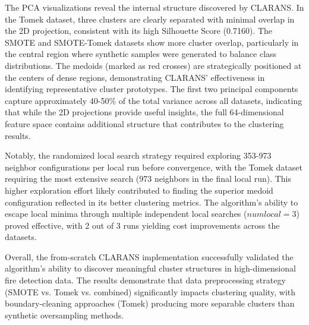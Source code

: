 The PCA visualizations reveal the internal structure discovered by CLARANS. In the Tomek dataset, three clusters are clearly separated with minimal overlap in the 2D projection, consistent with its high Silhouette Score (0.7160). The SMOTE and SMOTE-Tomek datasets show more cluster overlap, particularly in the central region where synthetic samples were generated to balance class distributions. The medoids (marked as red crosses) are strategically positioned at the centers of dense regions, demonstrating CLARANS' effectiveness in identifying representative cluster prototypes. The first two principal components capture approximately 40-50\% of the total variance across all datasets, indicating that while the 2D projections provide useful insights, the full 64-dimensional feature space contains additional structure that contributes to the clustering results.

Notably, the randomized local search strategy required exploring 353-973 neighbor configurations per local run before convergence, with the Tomek dataset requiring the most extensive search (973 neighbors in the final local run). This higher exploration effort likely contributed to finding the superior medoid configuration reflected in its better clustering metrics. The algorithm's ability to escape local minima through multiple independent local searches ($numlocal=3$) proved effective, with 2 out of 3 runs yielding cost improvements across the datasets.

Overall, the from-scratch CLARANS implementation successfully validated the algorithm's ability to discover meaningful cluster structures in high-dimensional fire detection data. The results demonstrate that data preprocessing strategy (SMOTE vs. Tomek vs. combined) significantly impacts clustering quality, with boundary-cleaning approaches (Tomek) producing more separable clusters than synthetic oversampling methods.